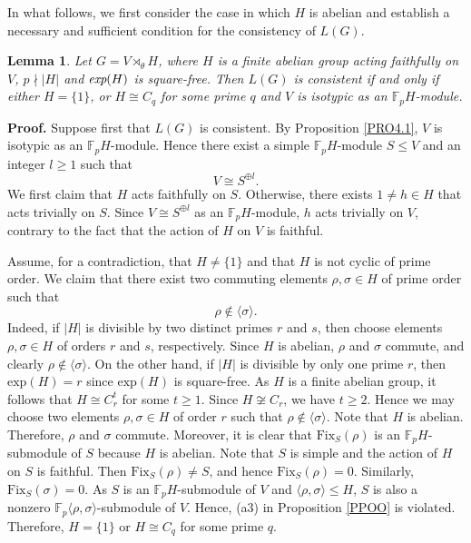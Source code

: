 \documentclass[12pt]{article}
\newtheorem{lemma}{\bf Lemma}[section]
\def\proof{{\bf Proof.} }
\begin{document}
In what follows, we first consider the case in which $H$ is abelian and establish a necessary and sufficient condition for the consistency of $L(G)$.
\begin{lemma}\label{OTH4.2}
Let $G=V\rtimes_{\theta} H$, where $H$ is a finite abelian group acting faithfully on $V$, $p\nmid |H|$ and $\emph{exp}(H)$ is square-free. Then $L(G)$ is consistent if and only if either $H=\{1\}$, or $H\cong C_q$ for some prime $q$ and $V$ is isotypic as an $\mathbb{F}_pH$-module.
\end{lemma}
\proof
Suppose first that $L(G)$ is consistent. By Proposition \ref{PRO4.1}, $V$ is isotypic as an $\mathbb{F}_pH$-module. Hence there exist a simple $\mathbb{F}_pH$-module $S\leq V$ and an integer $l\geq 1$ such that
$$V\cong S^{\oplus l}.$$ 
We first claim that $H$ acts
faithfully on $S$. Otherwise, there exists $1\neq h\in H$ that acts trivially on $S$. Since $V\cong S^{\oplus l}$ as an 
$\mathbb{F}_pH$-module, $h$ acts trivially on $V$, contrary to the fact that the action of $H$ on $V$ is faithful. 

Assume, for a contradiction, that $H\neq \{1\}$ and that $H$ is not cyclic of prime order. We claim that there exist two commuting elements $\rho,\sigma\in H$ of prime order such that $$\rho\notin\langle\sigma\rangle.$$ 
Indeed, if $|H|$ is divisible by 
two distinct primes $r$ and $s$, then choose elements $\rho, \sigma\in H$
of orders $r$ and $s$, respectively.  Since $H$ is abelian, $\rho$ and $\sigma$
commute, and clearly $\rho\notin\langle\sigma\rangle$.
On the other hand, if $|H|$ is divisible by only one prime $r$, then
$\mbox{exp}(H)=r$ since $\mbox{exp}(H)$ is square-free. As $H$ is a finite abelian group, it follows that $H\cong C^{t}_{r}$ 
for some $t\geq 1$. Since $H\not\cong C_r$, we have $t\geq 2$. Hence we may choose two elements $\rho,\sigma\in H$ of order $r$ such that
$\rho\notin\langle\sigma\rangle$. Note that $H$ is abelian. Therefore, $\rho$ and $\sigma$ commute.  Moreover, it is clear that $\mbox{Fix}_{S}(\rho)$ is an $\mathbb{F}_pH$-submodule of $S$ because $H$ is abelian. Note that $S$ is simple and the action of $H$ on $S$ is faithful. Then $\mbox{Fix}_{S}(\rho)\neq S$, and hence $\mbox{Fix}_{S}(\rho)=0$. Similarly, $\mbox{Fix}_{S}(\sigma)=0$. 
As $S$ is an $\mathbb{F}_pH$-submodule of $V$ and $\langle\rho,\sigma\rangle\leq H$, $S$ is also a nonzero 
$\mathbb{F}_p\langle \rho, \sigma\rangle$-submodule of $V$. Hence, (a3) in Proposition \ref{PPOO} is violated. Therefore, $H=\{1\}$ or $H\cong C_q$ for some prime $q$.
\end{document}
